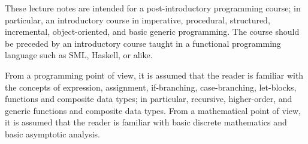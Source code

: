 These lecture notes are intended for a post-introductory programming course; in
particular, an introductory course in imperative, procedural, structured,
incremental, object-oriented, and basic generic programming. The course should
be preceded by an introductory course taught in a functional programming
language such as SML, Haskell, or alike.

From a programming point of view, it is assumed that the reader is familiar
with the concepts of expression, assignment, if-branching, case-branching,
let-blocks, functions and composite data types; in particular, recursive,
higher-order, and generic functions and composite data types. From a
mathematical point of view, it is assumed that the reader is familiar with
basic discrete mathematics and basic asymptotic analysis.
